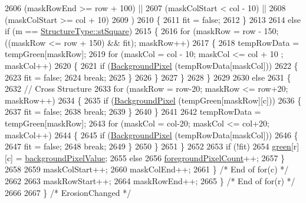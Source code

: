 \begin{DoxyCode}
2606              (maskRowEnd   >= row + 100)  ||  
2607              (maskColStart <  col - 10)   ||
2608              (maskColStart >= col + 10)
2609             )
2610         \{
2611           fit = \textcolor{keyword}{false};
2612         \}
2613 
2614         \textcolor{keywordflow}{else} \textcolor{keywordflow}{if}  (m == \hyperlink{class_k_k_b_1_1_morph_op_a09e4aff7e81327849855ff72082d85b3a04505973fd476144464695ac6483e490}{StructureType::stSquare})
2615         \{
2616           \textcolor{keywordflow}{for}  (maskRow = row - 150;  ((maskRow <= row + 150)  &&  fit);  maskRow++)
2617           \{
2618             tempRowData =  tempGreen[maskRow];
2619             \textcolor{keywordflow}{for}  (maskCol = col - 10;  maskCol <= col + 10 ; maskCol++)
2620             \{
2621               \textcolor{keywordflow}{if}  (\hyperlink{class_k_k_b_1_1_raster_a0756fb5530274d5e28858d3e1633d595}{BackgroundPixel} (tempRowData[maskCol]))
2622               \{
2623                 fit = \textcolor{keyword}{false};
2624                 \textcolor{keywordflow}{break};
2625               \}
2626             \}
2627           \} 
2628         \}
2629 
2630         \textcolor{keywordflow}{else}
2631         \{
2632           \textcolor{comment}{//  Cross Structure}
2633           \textcolor{keywordflow}{for}  (maskRow = row-20;  maskRow <= row+20;  maskRow++)
2634           \{
2635             \textcolor{keywordflow}{if}  (\hyperlink{class_k_k_b_1_1_raster_a0756fb5530274d5e28858d3e1633d595}{BackgroundPixel} (tempGreen[maskRow][c]))
2636             \{
2637               fit = \textcolor{keyword}{false};
2638               \textcolor{keywordflow}{break};
2639             \}
2640           \}
2641 
2642           tempRowData =  tempGreen[maskRow];
2643           \textcolor{keywordflow}{for}  (maskCol = col-20;  maskCol <= col+20;  maskCol++)
2644           \{
2645             \textcolor{keywordflow}{if}  (\hyperlink{class_k_k_b_1_1_raster_a0756fb5530274d5e28858d3e1633d595}{BackgroundPixel} (tempRowData[maskCol]))
2646             \{
2647               fit = \textcolor{keyword}{false};
2648               \textcolor{keywordflow}{break};
2649             \}
2650           \}
2651         \}
2652 
2653         \textcolor{keywordflow}{if}  (!fit)
2654           \hyperlink{class_k_k_b_1_1_raster_a2d2238911145488e226cd2e34fc8448c}{green}[r][c] = \hyperlink{class_k_k_b_1_1_raster_ab7ed2191cce116a6a37029dc6e3713ef}{backgroundPixelValue};
2655         \textcolor{keywordflow}{else}
2656           \hyperlink{class_k_k_b_1_1_raster_aa7e86253f4b9c347da718732e44b60e8}{foregroundPixelCount}++;
2657       \}
2658 
2659       maskColStart++;
2660       maskColEnd++;
2661     \}   \textcolor{comment}{/* End of for(c) */}
2662 
2663     maskRowStart++;
2664     maskRowEnd++;
2665   \}   \textcolor{comment}{/* End of for(r) */}
2666 
2667 \}  \textcolor{comment}{/* ErosionChanged */}
\end{DoxyCode}
